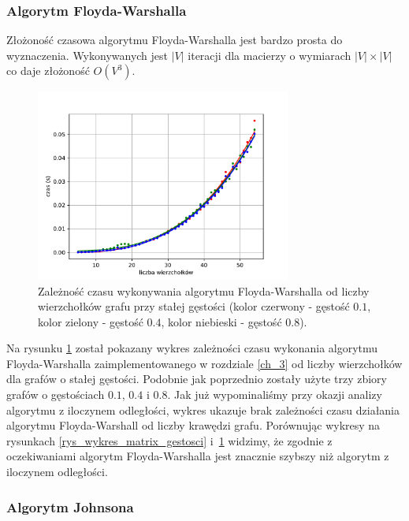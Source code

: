 \documentclass[12pt,a4paper]{book}
\theoremstyle{definition}
\numberwithin{equation}{chapter}
\begin{document}
\subsubsection*{Algorytm Floyda-Warshalla}
Złożoność czasowa algorytmu Floyda-Warshalla jest bardzo prosta do wyznaczenia. Wykonywanych jest $|V|$ iteracji dla macierzy o wymiarach $|V|\times |V|$ co daje złożoność $O(V^3)$.

\begin{figure}[H]
	\centering
	\includegraphics[width=0.75\textwidth]{images/Wykres_Floyd_Warshall_gestosci.pdf}
\caption{Zależność czasu wykonywania algorytmu Floyda-Warshalla od liczby wierzchołków grafu przy stałej gęstości (kolor czerwony - gęstość $0.1$, kolor zielony - gęstość $0.4$, kolor niebieski - gęstość $0.8$).}
	\label{rys_wykres_f_w_gestosci}
	\end{figure}

Na rysunku \ref{rys_wykres_f_w_gestosci} został pokazany wykres zależności czasu wykonania algorytmu Floyda-Warshalla zaimplementowanego w rozdziale \ref{ch_3} od liczby wierzchołków dla grafów o stałej gęstości. Podobnie jak poprzednio zostały użyte trzy zbiory grafów o gęstościach $0.1$, $0.4$ i $0.8$. Jak już wypominaliśmy przy okazji analizy algorytmu z iloczynem odległości, wykres ukazuje brak zależności czasu działania algorytmu Floyda-Warshall od liczby krawędzi grafu. Porównując wykresy na rysunkach \ref{rys_wykres_matrix_gestosci} i~\ref{rys_wykres_f_w_gestosci} widzimy, że zgodnie z oczekiwaniami algorytm Floyda-Warshalla jest znacznie szybszy niż algorytm z iloczynem odległości.



\subsubsection*{Algorytm Johnsona}
\end{document}
